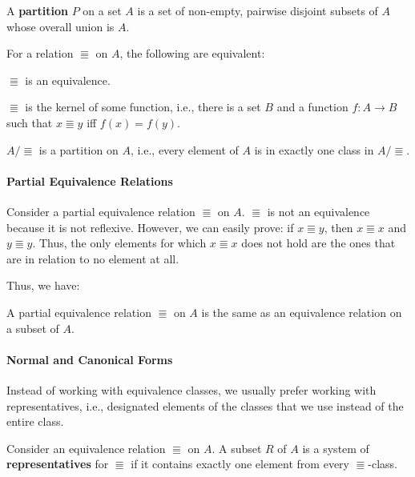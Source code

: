 \begin{definition}[Partition]
A \textbf{partition} $P$ on a set $A$ is a set of non-empty, pairwise disjoint subsets of $A$ whose overall union is $A$.
\end{definition}

\begin{theorem}
For a relation $\Equiv$ on $A$, the following are equivalent\footnotemark:
\begin{compactitem}
 \item $\Equiv$ is an equivalence.
 \item $\Equiv$ is the kernel of some function, i.e., there is a set $B$ and a function $f:A\to B$ such that $x\Equiv y$ iff $f(x)=f(y)$.
 \item $A/\Equiv$ is a partition on $A$, i.e., every element of $A$ is in exactly one class in $A/\Equiv$.
\end{compactitem}
\end{theorem}

\paragraph{Partial Equivalence Relations}
Consider a partial equivalence relation $\Equiv$ on $A$.
$\Equiv$ is not an equivalence because it is not reflexive.
However, we can easily prove: if $x \Equiv y$, then $x\Equiv x$ and $y\Equiv y$.
Thus, the only elements for which $x\Equiv x$ does not hold are the ones that are in relation to no element at all.

Thus, we have:
\begin{theorem}\label{thm:math:per}
A partial equivalence relation $\Equiv$ on $A$ is the same as an equivalence relation on a subset of $A$.
\end{theorem}

\paragraph{Normal and Canonical Forms}
Instead of working with equivalence classes, we usually prefer working with representatives, i.e., designated elements of the classes that we use instead of the entire class.

\begin{definition}
Consider an equivalence relation $\Equiv$ on $A$.
A subset $R$ of $A$ is a system of \textbf{representatives} for $\Equiv$ if it contains exactly one element from every $\Equiv$-class.
\end{definition}

